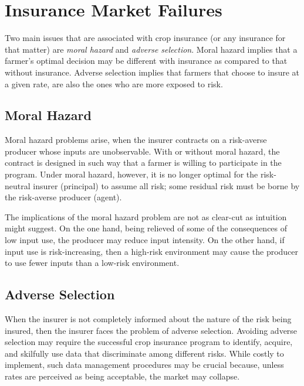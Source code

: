 \documentclass[
]{book}
\begin{document}
\hypertarget{insurance-market-failures}{%
\section{Insurance Market Failures}\label{insurance-market-failures}}

Two main issues that are associated with crop insurance (or any insurance for that matter) are \emph{moral hazard} and \emph{adverse selection}. Moral hazard implies that a farmer's optimal decision may be different with insurance as compared to that without insurance. Adverse selection implies that farmers that choose to insure at a given rate, are also the ones who are more exposed to risk.

\hypertarget{moral-hazard}{%
\subsection{Moral Hazard}\label{moral-hazard}}

Moral hazard problems arise, when the insurer contracts on a risk-averse producer whose inputs are unobservable. With or without moral hazard, the contract is designed in such way that a farmer is willing to participate in the program. Under moral hazard, however, it is no longer optimal for the risk-neutral insurer (principal) to assume all risk; some residual risk must be borne by the risk-averse producer (agent).

The implications of the moral hazard problem are not as clear-cut as intuition might suggest. On the one hand, being relieved of some of the consequences of low input use, the producer may reduce input intensity. On the other hand, if input use is risk-increasing, then a high-risk environment may cause the producer to use fewer inputs than a low-risk environment.

\hypertarget{adverse-selection}{%
\subsection{Adverse Selection}\label{adverse-selection}}

When the insurer is not completely informed about the nature of the risk being insured, then the insurer faces the problem of adverse selection. Avoiding adverse selection may require the successful crop insurance program to identify, acquire, and skilfully use data that discriminate among different risks. While costly to implement, such data management procedures may be crucial because, unless rates are perceived as being acceptable, the market may collapse.
\end{document}
